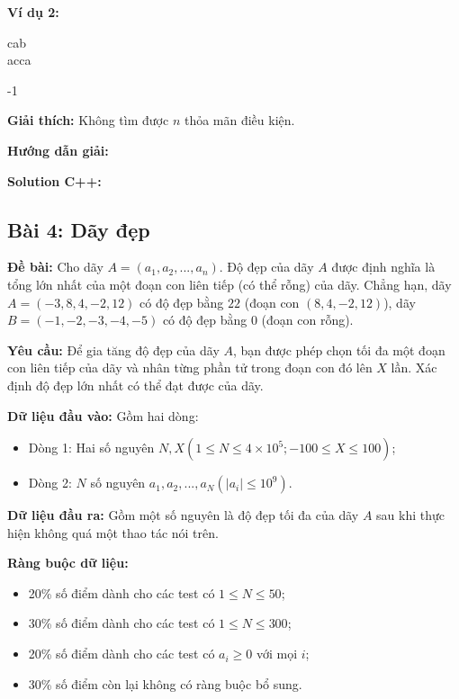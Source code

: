 \documentclass[12pt]{scrartcl}  %
\begin{document}
\textbf{Ví dụ 2:}
\begin{tcolorbox}[colback=gray!5!white, colframe=blue!50!black, title=Input]
cab\\
acca
\end{tcolorbox}
\begin{tcolorbox}[colback=gray!5!white, colframe=green!50!black, title=Output]
-1
\end{tcolorbox}

\textbf{Giải thích:} 
Không tìm được $n$ thỏa mãn điều kiện.

\textbf{Hướng dẫn giải:}

\textbf{Solution C++:}

\subsection{Bài 4: Dãy đẹp}

\textbf{Đề bài:}
Cho dãy $A = (a_1, a_2, ... , a_n)$. Độ đẹp của dãy $A$ được định nghĩa là tổng lớn nhất của một đoạn con liên tiếp (có thể rỗng) của dãy. Chẳng hạn, dãy 
$A = (-3, 8, 4, -2, 12)$ có độ đẹp bằng $22$ (đoạn con $(8, 4, -2, 12)$), dãy $B = (-1, -2, -3, -4, -5)$ có độ đẹp bằng $0$ (đoạn con rỗng).

\textbf{Yêu cầu:}
Để gia tăng độ đẹp của dãy $A$, bạn được phép chọn tối đa một đoạn con liên tiếp của dãy và nhân từng phần tử trong đoạn con đó lên 
$X$ lần. Xác định độ đẹp lớn nhất có thể đạt được của dãy.

\textbf{Dữ liệu đầu vào:}
Gồm hai dòng:
\begin{itemize}
    \item Dòng 1: Hai số nguyên $N, X (1 \leq N \leq 4 \times 10^5; -100 \leq X \leq 100)$;
    \item Dòng 2: $N$ số nguyên $a_1, a_2, ..., a_N (|a_i| \leq 10^9)$.
\end{itemize}

\textbf{Dữ liệu đầu ra:}
Gồm một số nguyên là độ đẹp tối đa của dãy $A$ sau khi thực hiện không quá một thao tác nói trên.

\textbf{Ràng buộc dữ liệu:}
\begin{itemize}
    \item 20\% số điểm dành cho các test có $1 \leq N \leq 50$;
    \item 30\% số điểm dành cho các test có $1 \leq N \leq 300$;
    \item 20\% số điểm dành cho các test có $a_i \geq 0$ với mọi $i$;
    \item 30\% số điểm còn lại không có ràng buộc bổ sung.
\end{itemize}
\end{document}

